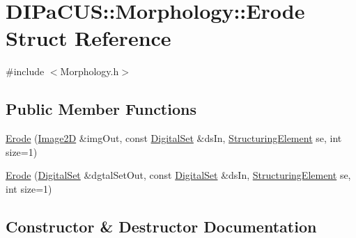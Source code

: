 \hypertarget{structDIPaCUS_1_1Morphology_1_1Erode}{}\section{D\+I\+Pa\+C\+US\+:\+:Morphology\+:\+:Erode Struct Reference}
\label{structDIPaCUS_1_1Morphology_1_1Erode}


{\ttfamily \#include $<$Morphology.\+h$>$}

\subsection*{Public Member Functions}
\begin{DoxyCompactItemize}
\item 
\mbox{\hyperlink{structDIPaCUS_1_1Morphology_1_1Erode_a66ba332d817147b35a3784fe752bf28d}{Erode}} (\mbox{\hyperlink{namespaceDIPaCUS_1_1Morphology_a9aff9edf28d681accfc54435fbefcbee}{Image2D}} \&img\+Out, const \mbox{\hyperlink{namespaceDIPaCUS_1_1Morphology_ab69fa725716b0ed4c311c0d00a292be7}{Digital\+Set}} \&ds\+In, \mbox{\hyperlink{namespaceDIPaCUS_1_1Morphology_a60b552d68432e7992f09717070d9c4e7}{Structuring\+Element}} se, int size=1)
\item 
\mbox{\hyperlink{structDIPaCUS_1_1Morphology_1_1Erode_adcbd2d42bb448c5052addb2e57b9ad39}{Erode}} (\mbox{\hyperlink{namespaceDIPaCUS_1_1Morphology_ab69fa725716b0ed4c311c0d00a292be7}{Digital\+Set}} \&dgtal\+Set\+Out, const \mbox{\hyperlink{namespaceDIPaCUS_1_1Morphology_ab69fa725716b0ed4c311c0d00a292be7}{Digital\+Set}} \&ds\+In, \mbox{\hyperlink{namespaceDIPaCUS_1_1Morphology_a60b552d68432e7992f09717070d9c4e7}{Structuring\+Element}} se, int size=1)
\end{DoxyCompactItemize}


\subsection{Constructor \& Destructor Documentation}
\mbox{\label{structDIPaCUS_1_1Morphology_1_1Erode_a66ba332d817147b35a3784fe752bf28d}} 
